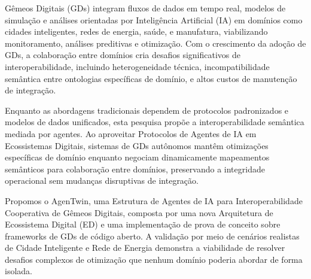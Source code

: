 \begin{translatedabstract}

Gêmeos Digitais (GDs) integram fluxos de dados em tempo real, modelos de simulação e análises orientadas por Inteligência Artificial (IA) em domínios como
    cidades inteligentes,
    redes de energia,
    saúde, e
    manufatura,
    viabilizando monitoramento, análises preditivas e otimização.
Com o crescimento da adoção de GDs, a colaboração entre domínios cria desafios significativos de interoperabilidade, incluindo
    heterogeneidade técnica,
    incompatibilidade semântica entre ontologias específicas de domínio, e
    altos custos de manutenção de integração.

Enquanto as abordagens tradicionais dependem de protocolos padronizados e modelos de dados unificados, esta pesquisa propõe a interoperabilidade semântica mediada por agentes.
Ao aproveitar Protocolos de Agentes de IA em Ecossistemas Digitais, sistemas de GDs autônomos mantêm otimizações específicas de domínio
    enquanto negociam dinamicamente mapeamentos semânticos para colaboração entre domínios,
    preservando a integridade operacional sem mudanças disruptivas de integração.

Propomos o AgenTwin, uma Estrutura de Agentes de IA para Interoperabilidade Cooperativa de Gêmeos Digitais, composta por
    uma nova Arquitetura de Ecossistema Digital (ED) e
    uma implementação de prova de conceito sobre frameworks de GDs de código aberto.
A validação por meio de cenários realistas de Cidade Inteligente e Rede de Energia demonstra
    a viabilidade de resolver desafios complexos de otimização que nenhum domínio poderia abordar de forma isolada.
\end{translatedabstract}
